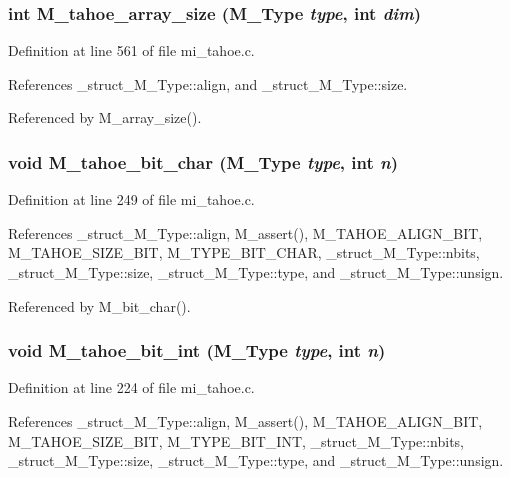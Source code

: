 \subsubsection{\setlength{\rightskip}{0pt plus 5cm}int M\_\-tahoe\_\-array\_\-size (\bf{M\_\-Type} {\em type}, int {\em dim})}\label{m__tahoe_8h_3eee62ce39ed239f6ece3b07c8ffcf34}




Definition at line 561 of file mi\_\-tahoe.c.

References \_\-struct\_\-M\_\-Type::align, and \_\-struct\_\-M\_\-Type::size.

Referenced by M\_\-array\_\-size().
\subsubsection{\setlength{\rightskip}{0pt plus 5cm}void M\_\-tahoe\_\-bit\_\-char (\bf{M\_\-Type} {\em type}, int {\em n})}\label{m__tahoe_8h_2933c805e70790bd174a1d77ecda16b2}




Definition at line 249 of file mi\_\-tahoe.c.

References \_\-struct\_\-M\_\-Type::align, M\_\-assert(), M\_\-TAHOE\_\-ALIGN\_\-BIT, M\_\-TAHOE\_\-SIZE\_\-BIT, M\_\-TYPE\_\-BIT\_\-CHAR, \_\-struct\_\-M\_\-Type::nbits, \_\-struct\_\-M\_\-Type::size, \_\-struct\_\-M\_\-Type::type, and \_\-struct\_\-M\_\-Type::unsign.

Referenced by M\_\-bit\_\-char().
\subsubsection{\setlength{\rightskip}{0pt plus 5cm}void M\_\-tahoe\_\-bit\_\-int (\bf{M\_\-Type} {\em type}, int {\em n})}\label{m__tahoe_8h_0628ab5edcaae873895eb3622bab42ac}




Definition at line 224 of file mi\_\-tahoe.c.

References \_\-struct\_\-M\_\-Type::align, M\_\-assert(), M\_\-TAHOE\_\-ALIGN\_\-BIT, M\_\-TAHOE\_\-SIZE\_\-BIT, M\_\-TYPE\_\-BIT\_\-INT, \_\-struct\_\-M\_\-Type::nbits, \_\-struct\_\-M\_\-Type::size, \_\-struct\_\-M\_\-Type::type, and \_\-struct\_\-M\_\-Type::unsign.

